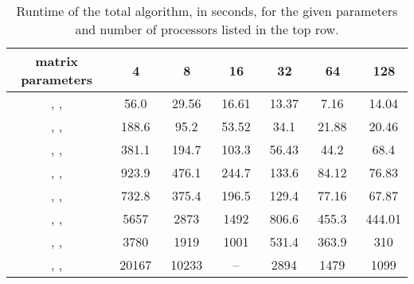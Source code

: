 \documentclass[11pt]{article}
\begin{document}
\begin{table}[here]
\centering
\begin{tabular}{|c|c|c|c|c|c|c|}\hline
matrix parameters &\ 4 &\ 8 &\ 16 &\ 32 &\ 64 &\ 128  \\ \hline
, ,  &\ 56.0 &\ 29.56  &\  16.61  &\  13.37 &\  7.16  &\ 14.04  \\ 
, ,  &\  188.6 &\ 95.2  &\ 53.52  &\ 34.1  &\ 21.88   &\  20.46  \\ 
, ,  &\ 381.1   &\  194.7 &\  103.3   &\  56.43   &\  44.2  &\  68.4  \\ 
, ,  &\ 923.9  &\  476.1 &\  244.7 &\ 133.6  &\  84.12  &\  76.83 \\ 
, ,  &\  732.8 &\  375.4 &\ 196.5  &\  129.4 &\  77.16   &\ 67.87  \\ 
, ,  &\   5657 &\  2873 &\ 1492  &\  806.6 &\   455.3 &\  444.01 \\ 
, ,  &\ 3780  &\  1919 &\   1001 &\  531.4 &\  363.9   &\  310  \\ 
, ,  &\  20167 &\ 10233 &\  -- &\  2894 &\    1479 &\  1099  \\  \hline
\end{tabular}
\caption{Runtime of the total algorithm, in seconds, for the given parameters and number of processors listed in the top row.}
\label{bigt}
\end{table}
\end{document}
